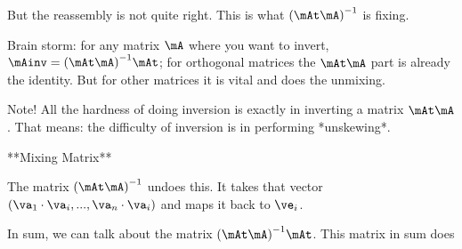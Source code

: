 But the reassembly is not quite right. This is what $\parensinv{\mAt
\mA}$ is fixing.

Brain storm: for any matrix $\mA$ where you want to invert, $\mAinv =
\parensinv{\mAt \mA} \mAt$; for orthogonal matrices the $\mAt \mA$ part
is already the identity. But for other matrices it is vital and does the
unmixing.

Note! All the hardness of doing inversion is exactly in inverting a
matrix $\mAt \mA$. That means: the difficulty of inversion is in
performing *unskewing*.

**Mixing Matrix**

The matrix $\parensinv{\mAt \mA}$ undoes this. It takes that vector
$(\va_1 \cdot \va_i, ..., \va_n \cdot \va_i)$ and maps it back to
$\ve_i$.

In sum, we can talk about the matrix $\parensinv{\mAt \mA} \mAt$. This
matrix in sum does
